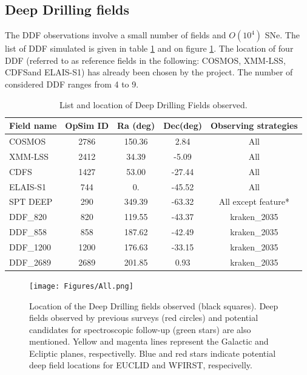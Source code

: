 \documentclass [11pt,a4paper]{article}
\newcommand{\cosmos}{COSMOS}
\newcommand{\xmmlss}{XMM-LSS}
\newcommand{\cdfs}{CDFS}
\newcommand{\elais}{ELAIS-S1}
\newcommand{\spt}{SPT DEEP}
\newcommand{\ddfa}{DDF\_820}
\newcommand{\ddfb}{DDF\_858}
\newcommand{\ddfc}{DDF\_1200}
\newcommand{\ddfd}{DDF\_2689}
\begin{document}
\subsection{Deep Drilling fields}
The DDF  observations involve a  small number of fields  and $O(10^4)$
SNe. The list of DDF simulated is given in table
\ref{tab:ddf_list} and on figure \ref{fig:ddf_map}. The location of four DDF (referred to as reference fields in the following: \cosmos, \xmmlss, \cdfs and \elais) has already been chosen by the project. The number of considered DDF ranges from 4 to 9.


\begin{table}[!htbp]
  \begin{center}
  \begin{tabular}{|l|c|c|c|c|}
    \hline
    Field name & OpSim ID & Ra (deg) & Dec(deg) & Observing strategies\\
    \hline
    \cosmos & 2786 & 150.36 & 2.84 &All \\
    \xmmlss & 2412 & 34.39 & -5.09 & All \\
    \cdfs & 1427 & 53.00 & -27.44 & All \\
    \elais & 744 & 0.  & -45.52 & All \\
    \spt & 290 & 349.39 & -63.32 & All except feature*\\
    \ddfa & 820 & 119.55 & -43.37 & kraken\_2035\\
    \ddfb & 858 & 187.62 & -42.49 & kraken\_2035\\
    \ddfc & 1200 & 176.63 & -33.15 & kraken\_2035\\
    \ddfd & 2689 & 201.85 & 0.93 & kraken\_2035\\
    \hline
  \end{tabular}
  \caption{List and location of Deep Drilling Fields observed.}\label{tab:ddf_list}
  \end{center}
\end{table}


\begin{figure}[htbp]
\begin{center}
\texttt{[image: Figures/All.png]}
\caption{Location of the Deep Drilling fields observed (black squares). Deep fields observed by previous surveys (red circles) and potential candidates for spectroscopic follow-up (green stars) are also mentioned. Yellow and magenta lines represent the Galactic and Ecliptic planes, respectivelly. Blue and red stars indicate potential deep field locations for EUCLID and WFIRST, respecivelly.}\label{fig:ddf_map}
\end{center}
\end{figure}
\end{document}
